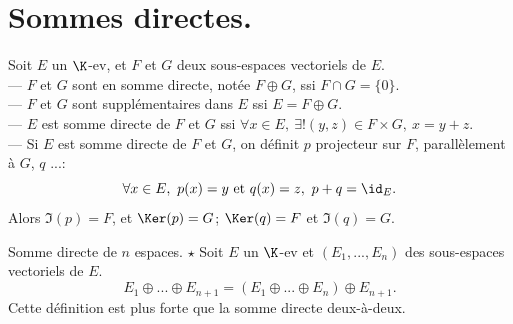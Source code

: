 \documentclass[11pt]{article}
\begin{document}
\section{Sommes directes.}

\begin{rappel}{}{}
    Soit $E$ un $\K$-ev, et $F$ et $G$ deux sous-espaces vectoriels de $E$.\\
    --- $F$ et $G$ sont en somme directe, notée $F\oplus G$, ssi $F\cap G=\{0\}$.\\
    --- $F$ et $G$ sont supplémentaires dans $E$ ssi $E=F\oplus G$.\\
    --- $E$ est somme directe de $F$ et $G$ ssi $\forall x \in E, ~ \exists !(y,z)\in F\times G, ~ x=y+z$.\\
    --- Si $E$ est somme directe de $F$ et $G$, on définit $p$ projecteur sur $F$, parallèlement à $G$, $q$ ...:
    \begin{equation*}
        \forall x \in E, ~ p(x)=y \text{ et } q(x)=z, ~ p+q=\id_E.
    \end{equation*}
    Alors $\Im(p)=F$, et $\Ker(p)=G$; $\Ker(q)=F$ et $\Im(q)=G$.
\end{rappel}

\vspace*{-0.8cm}

\begin{defi}{Somme directe de $n$ espaces. $\star$}{}
    Soit $E$ un $\K$-ev et $(E_1,...,E_n)$ des sous-espaces vectoriels de $E$.
    \begin{equation*}
        E_1 \oplus ... \oplus E_{n+1} = (E_1 \oplus ... \oplus E_n) \oplus E_{n+1}.
    \end{equation*}
    \warning Cette définition est plus forte que la somme directe deux-à-deux.
\end{defi}

\vspace*{-0.8cm}
\end{document}
